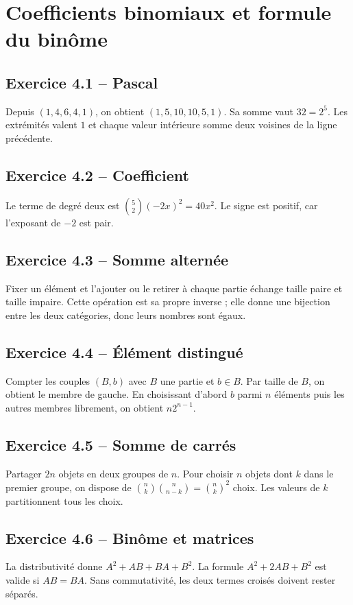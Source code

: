 \chapter{Coefficients binomiaux et formule du binôme}
\section*{Exercice 4.1 -- Pascal}
Depuis $(1,4,6,4,1)$, on obtient $(1,5,10,10,5,1)$. Sa somme vaut $32=2^5$. Les extrémités valent $1$ et chaque valeur intérieure somme deux voisines de la ligne précédente.

\section*{Exercice 4.2 -- Coefficient}
Le terme de degré deux est $\binom52(-2x)^2=40x^2$. Le signe est positif, car l'exposant de $-2$ est pair.

\section*{Exercice 4.3 -- Somme alternée}
Fixer un élément et l'ajouter ou le retirer à chaque partie échange taille paire et taille impaire. Cette opération est sa propre inverse ; elle donne une bijection entre les deux catégories, donc leurs nombres sont égaux.

\section*{Exercice 4.4 -- Élément distingué}
Compter les couples $(B,b)$ avec $B$ une partie et $b\in B$. Par taille de $B$, on obtient le membre de gauche. En choisissant d'abord $b$ parmi $n$ éléments puis les autres membres librement, on obtient $n2^{n-1}$.

\section*{Exercice 4.5 -- Somme de carrés}
Partager $2n$ objets en deux groupes de $n$. Pour choisir $n$ objets dont $k$ dans le premier groupe, on dispose de $\binom nk\binom n{n-k}=\binom nk^2$ choix. Les valeurs de $k$ partitionnent tous les choix.

\section*{Exercice 4.6 -- Binôme et matrices}
La distributivité donne $A^2+AB+BA+B^2$. La formule $A^2+2AB+B^2$ est valide si $AB=BA$. Sans commutativité, les deux termes croisés doivent rester séparés.
